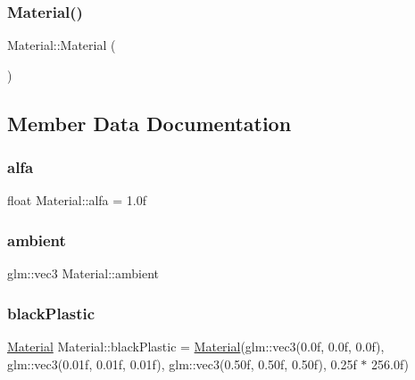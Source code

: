 \mbox{\label{struct_material_a137e987401b63eb7c6c27c3e38bc74b5}} 
\subsubsection{\texorpdfstring{Material()}{Material()}\hspace{0.1cm}{\footnotesize\ttfamily [2/2]}}
{\footnotesize\ttfamily Material\+::\+Material (\begin{DoxyParamCaption}{ }\end{DoxyParamCaption})\hspace{0.3cm}{\ttfamily [inline]}}



\subsection{Member Data Documentation}
\mbox{\label{struct_material_ab331a289b85cc07810ded7f4ebb66175}} 
\subsubsection{\texorpdfstring{alfa}{alfa}}
{\footnotesize\ttfamily float Material\+::alfa = 1.\+0f}

\mbox{\label{struct_material_af99c823542e497c98a35d1aac5fc9012}} 
\subsubsection{\texorpdfstring{ambient}{ambient}}
{\footnotesize\ttfamily glm\+::vec3 Material\+::ambient}

\mbox{\label{struct_material_a7d31f06894812f15ccca287f46703b99}} 
\subsubsection{\texorpdfstring{blackPlastic}{blackPlastic}}
{\footnotesize\ttfamily \mbox{\hyperlink{struct_material}{Material}} Material\+::black\+Plastic = \mbox{\hyperlink{struct_material}{Material}}(glm\+::vec3(0.\+0f, 0.\+0f, 0.\+0f), glm\+::vec3(0.\+01f, 0.\+01f, 0.\+01f), glm\+::vec3(0.\+50f, 0.\+50f, 0.\+50f), 0.\+25f $\ast$ 256.\+0f)\hspace{0.3cm}{\ttfamily [static]}}

